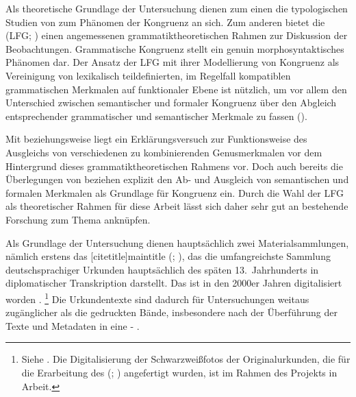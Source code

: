 Als theoretische Grundlage der Untersuchung dienen zum einen die typologischen
Studien von \citet{corbett1979,corbett1983,corbett1991,corbett2006} zum
Phänomen der Kongruenz an sich. Zum anderen bietet die  (LFG;
\cites{kaplanbresnan1982}{bresnan2001}{bresnanetal2016}) einen angemessenen
grammatiktheoretischen Rahmen zur Diskussion der Beobachtungen. Grammatische
Kongruenz stellt ein genuin morphosyntaktisches Phänomen dar. Der Ansatz der
LFG mit ihrer Modellierung von Kongruenz als
Vereinigung von lexikalisch teildefinierten, im Regelfall kompatiblen
grammatischen Merkmalen auf funktionaler Ebene ist
nützlich, um vor allem den Unterschied zwischen semantischer und formaler
Kongruenz über den Abgleich entsprechender grammatischer und semantischer
Merkmale zu fassen ().

Mit \citet[171--195]{wechslerzlatic2003} beziehungsweise \citet{wechsler2009}
liegt ein Erklärungsversuch zur Funktionsweise des Ausgleichs von verschiedenen
zu kombinierenden Genusmerkmalen vor dem Hintergrund dieses
grammatik\-theoretischen Rahmens vor. Doch auch bereits die Überlegungen von
\citet[237--264]{askedal1973} beziehen explizit den Ab- und Ausgleich von
semantischen und formalen
Merkmalen als Grundlage für Kongruenz ein. Durch die
Wahl der LFG als theoretischer Rahmen für diese
Arbeit lässt sich daher sehr gut an bestehende Forschung zum Thema anknüpfen.

Als Grundlage der Untersuchung dienen hauptsächlich zwei Materialsammlungen,
nämlich erstens das [citetitle]{maintitle} (\CAO{};
\nosh\cites{cao1,cao2,cao3,cao4,caor,cao5}), das die umfangreichste Sammlung
deutschsprachiger Urkunden hauptsächlich des späten 13.~Jahrhunderts in
diplomatischer Transkription darstellt. Das \CAO{} ist in den 2000er Jahren
digitalisiert worden \autocite{cao-online}.%
%
	\footnote{Siehe . Die Digitalisierung der
		Schwarzweißfotos der Originalurkunden, die für die
		Erarbeitung des  (\WMU{};
		\nosh\cites{wmu1,wmu2,wmu3}) angefertigt wurden, ist im Rahmen des
		Projekts  in Arbeit.}
%
Die Urkundentexte sind dadurch für Untersuchungen weitaus zugänglicher als die
gedruckten Bände, insbesondere nach der Überführung der Texte und Metadaten in
eine -
\autocites[207]{beckerschallert2021}[155--156]{beckerschallert2022b}.

